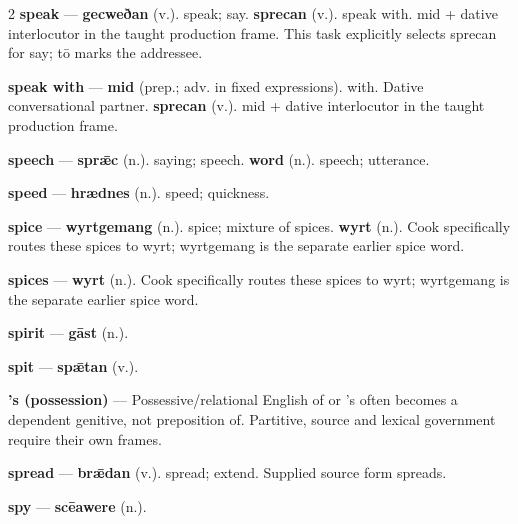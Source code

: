 \begin{multicols}{2}
\textbf{speak} — \textbf{gecweðan} (v.). speak; say. \textbf{sprecan} (v.). speak with. mid + dative interlocutor in the taught production frame. This task explicitly selects sprecan for say; tō marks the addressee.\par
\textbf{speak with} — \textbf{mid} (prep.; adv. in fixed expressions). with. Dative conversational partner. \textbf{sprecan} (v.). mid + dative interlocutor in the taught production frame.\par
\textbf{speech} — \textbf{sprǣc} (n.). saying; speech. \textbf{word} (n.). speech; utterance.\par
\textbf{speed} — \textbf{hrædnes} (n.). speed; quickness.\par
\textbf{spice} — \textbf{wyrtgemang} (n.). spice; mixture of spices. \textbf{wyrt} (n.). Cook specifically routes these spices to wyrt; wyrtgemang is the separate earlier spice word.\par
\textbf{spices} — \textbf{wyrt} (n.). Cook specifically routes these spices to wyrt; wyrtgemang is the separate earlier spice word.\par
\textbf{spirit} — \textbf{gāst} (n.).\par
\textbf{spit} — \textbf{spǣtan} (v.).\par
\textbf{'s (possession)} — Possessive/relational English of or 's often becomes a dependent genitive, not preposition of. Partitive, source and lexical government require their own frames.\par
\textbf{spread} — \textbf{brǣdan} (v.). spread; extend. Supplied source form spreads.\par
\textbf{spy} — \textbf{scēawere} (n.).\par

\end{multicols}
